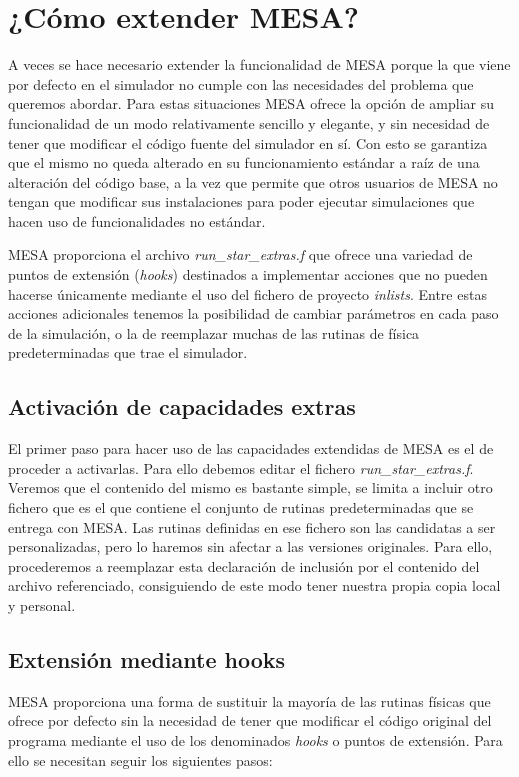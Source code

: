 \section{¿Cómo extender MESA?}
A veces se hace necesario extender la funcionalidad de MESA porque la que viene por defecto en el simulador no cumple con las necesidades del problema que queremos abordar. Para estas situaciones MESA ofrece la opción de ampliar su funcionalidad de un modo relativamente sencillo y elegante, y sin necesidad de tener que modificar el código fuente del simulador en sí. Con esto se garantiza que el mismo no queda alterado en su funcionamiento estándar a raíz de una alteración del código base, a la vez que permite que otros usuarios de MESA no tengan que modificar sus instalaciones para poder ejecutar simulaciones que hacen uso de funcionalidades no estándar. \par

MESA proporciona el archivo \textit{run\_star\_extras.f} que ofrece una variedad de puntos de extensión (\textit{hooks}) destinados a implementar acciones que no pueden hacerse únicamente mediante el uso del fichero de proyecto \textit{inlists}. Entre estas acciones adicionales tenemos la posibilidad de cambiar parámetros en cada paso de la simulación, o la de reemplazar muchas de las rutinas de física predeterminadas que trae el simulador.\par

\subsection{Activación de capacidades extras}
El primer paso para hacer uso de las capacidades extendidas de MESA es el de proceder a activarlas. Para ello debemos editar el fichero \textit{run\_star\_extras.f}. Veremos que el contenido del mismo es bastante simple, se limita a incluir otro fichero que es el que contiene el conjunto de rutinas predeterminadas que se entrega con MESA. Las rutinas definidas en ese fichero son las candidatas a ser personalizadas, pero lo haremos sin afectar a las versiones originales. Para ello, procederemos a reemplazar esta declaración de inclusión por el contenido del archivo referenciado, consiguiendo de este modo tener nuestra propia copia local y personal.\par

\subsection{Extensión mediante hooks}
MESA proporciona una forma de sustituir la mayoría de las rutinas físicas que ofrece por defecto sin la necesidad de tener que modificar el código original del programa mediante el uso de los denominados \textit{hooks} o puntos de extensión. Para ello se necesitan seguir los siguientes pasos:

